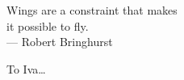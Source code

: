 \cleardoublepage
\thispagestyle{empty}


\vspace*{3cm}

\begin{raggedleft}
    	Wings are a constraint that makes \\
	it possible to fly.\\
     --- Robert Bringhurst\\
\end{raggedleft}

\vspace{4cm}

\begin{center}
    To Iva\dots
\end{center}


